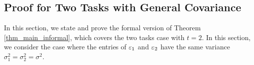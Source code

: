 \subsection{Proof for Two Tasks with General Covariance}\label{app_proof_main}


In this section, we state and prove the formal version of Theorem \ref{thm_main_informal}, which covers the two tasks case with $t=2$. In this section, we consider the case where the entries of ${\varepsilon}_1$ and ${\varepsilon}_2$ have the same variance $\sigma_1^2=\sigma_2^2=\sigma^2$. 


